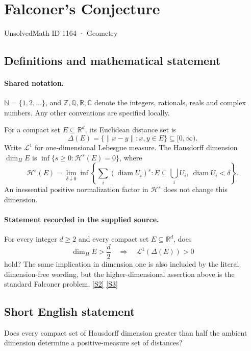\documentclass[11pt]{article}
\newcommand{\sref}[2]{\hyperlink{source:#1:#2}{[S#2]}}
\begin{document}
\setcounter{section}{1163}
\section{Falconer's Conjecture}\label{1164}
{\small\sffamily UnsolvedMath ID 1164 · Geometry}
\subsection{Definitions and mathematical statement}

\paragraph{Shared notation.}$\mathbb N=\{1,2,\ldots\}$, and $\mathbb Z,\mathbb Q,\mathbb R,\mathbb C$ denote the integers, rationals, reals and complex numbers. Any other conventions are specified locally.


For a compact set \(E\subseteq\mathbb R^d\), its Euclidean
distance set is
\[
 \Delta(E)=\{\|x-y\|:x,y\in E\}\subseteq[0,\infty).
\]
Write \(\mathcal L^1\) for one-dimensional Lebesgue measure.
The Hausdorff dimension \(\dim_H E\) is
\(\inf\{s\ge0:\mathcal H^s(E)=0\}\), where
\[
 \mathcal H^s(E)=
 \lim_{\delta\downarrow0}\inf
 \left\{\sum_i(\operatorname{diam}U_i)^s:
       E\subseteq\bigcup_iU_i,\ \operatorname{diam}U_i<\delta\right\}.
\]
An inessential positive normalization factor in \(\mathcal H^s\)
does not change this dimension.
\paragraph{Statement recorded in the supplied source.}
For every integer \(d\ge2\) and every compact set
\(E\subseteq\mathbb R^d\), does
\[
 \dim_H E>\frac d2
       \quad\Longrightarrow\quad
 \mathcal L^1(\Delta(E))>0
\]
hold?  The same implication in dimension one is also included by
the literal dimension-free wording, but the higher-dimensional
assertion above is the standard Falconer problem. \sref{1164}{2} \sref{1164}{3}
\subsection{Short English statement}
Does every compact set of Hausdorff dimension greater than half the ambient dimension determine a positive-measure set of distances?
\end{document}
